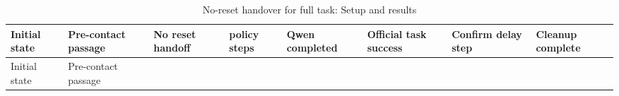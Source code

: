 \FloatBarrier\begingroup\small\setlength{\tabcolsep}{2.5pt}
\begin{longtable}[]{@{}
  >{\raggedleft\arraybackslash}p{}
  >{\raggedright\arraybackslash}p{}
  >{\raggedright\arraybackslash}p{}
  >{\raggedleft\arraybackslash}p{}
  >{\raggedright\arraybackslash}p{}
  >{\raggedright\arraybackslash}p{}
  >{\raggedleft\arraybackslash}p{}
  >{\raggedright\arraybackslash}p{}@{}}
\caption{No-reset handover for full task: Setup and results}\label{tab:s20-1}\tabularnewline
\toprule\noalign{}
\begin{minipage}[b]{\linewidth}\raggedleft
Initial state
\end{minipage} & \begin{minipage}[b]{\linewidth}\raggedright
Pre-contact passage
\end{minipage} & \begin{minipage}[b]{\linewidth}\raggedright
No reset handoff
\end{minipage} & \begin{minipage}[b]{\linewidth}\raggedleft
policy steps
\end{minipage} & \begin{minipage}[b]{\linewidth}\raggedright
Qwen completed
\end{minipage} & \begin{minipage}[b]{\linewidth}\raggedright
Official task success
\end{minipage} & \begin{minipage}[b]{\linewidth}\raggedleft
Confirm delay step
\end{minipage} & \begin{minipage}[b]{\linewidth}\raggedright
Cleanup complete
\end{minipage} \\
\midrule\noalign{}
\endfirsthead
\toprule\noalign{}
\begin{minipage}[b]{\linewidth}\raggedleft
Initial state
\end{minipage} & \begin{minipage}[b]{\linewidth}\raggedright
Pre-contact passage
\end{minipage} & \begin{minipage}[b]{\linewidth}\raggedright

\end{minipage}
\end{longtable}
